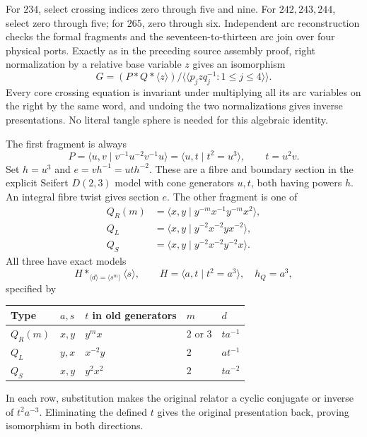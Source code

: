 \documentclass[11pt]{article}
\begin{document}
For $234$, select crossing indices zero through five and nine.
For $242,243,244$, select zero through five; for $265$, zero through six.
Independent arc reconstruction checks the formal
fragments and the seventeen-to-thirteen arc join over four physical ports.
Exactly as in the preceding source assembly proof, right normalization
by a relative base variable $z$ gives an isomorphism
\begin{equation}\label{eq:assembly}
 G=(P*Q*\langle z\rangle)/
 \langle\!\langle p_jzq_j^{-1}:1\le j\le4\rangle\!\rangle.
\end{equation}
Every core crossing equation is invariant under multiplying all its arc
variables on the right by the same word, and undoing the two normalizations
gives inverse presentations. No literal tangle sphere is needed for this
algebraic identity.

The first fragment is always
\[
 P=\langle u,v\mid v^{-1}u^{-2}v^{-1}u\rangle
   =\langle u,t\mid t^2=u^3\rangle,\qquad t=u^2v.
\]
Set $h=u^3$ and $e=vh^{-1}=ut h^{-2}$. These are a fibre and boundary
section in the explicit Seifert $D(2,3)$ model with cone generators
$u,t$, both having powers $h$. An integral fibre twist gives section $e$.
The other fragment is one of
\begin{align*}
 Q_R(m)&=\langle x,y\mid y^{-m}x^{-1}y^{-m}x^2\rangle,\\
 Q_L&=\langle x,y\mid y^{-2}x^{-2}yx^{-2}\rangle,\\
 Q_S&=\langle x,y\mid y^{-2}x^{-2}y^{-2}x\rangle.
\end{align*}
All three have exact models
\begin{equation}\label{eq:root}
 H*_{\langle d\rangle=\langle s^m\rangle}\langle s\rangle,
 \qquad H=\langle a,t\mid t^2=a^3\rangle,
 \quad h_Q=a^3,
\end{equation}
specified by
\begin{center}
\begin{tabular}{lllll}
\toprule
Type & $a,s$ & $t$ in old generators & $m$ & $d$\\
\midrule
$Q_R(m)$ & $x,y$ & $y^m x$ & $2$ or $3$ & $ta^{-1}$\\
$Q_L$ & $y,x$ & $x^{-2}y$ & $2$ & $at^{-1}$\\
$Q_S$ & $x,y$ & $y^2x^2$ & $2$ & $ta^{-2}$\\
\bottomrule
\end{tabular}
\end{center}
In each row, substitution makes the original relator a cyclic conjugate
or inverse of $t^2a^{-3}$. Eliminating the defined $t$ gives the original
presentation back, proving isomorphism in both directions.
\end{document}
